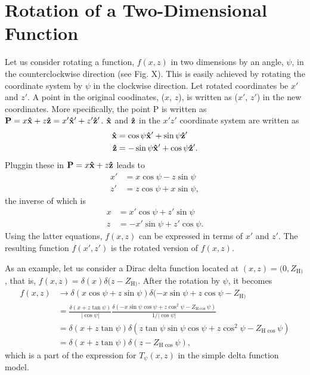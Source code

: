 \documentclass[12pt,letterpaper]{article}
\newcommand{\zh}[1]{Z_{\mathrm{H}#1}}
\begin{document}
\section{Rotation of a Two-Dimensional Function}
Let us consider rotating a function, $f(x,z)$ in two dimensions by an angle, 
$\psi$, in the counterclockwise direction (see Fig. X). This is easily 
achieved by rotating the coordinate system by $\psi$ in the clockwise direction. 
Let rotated coordinates be $x'$ and $z'$. A point in the original coodinates,
($x$, $z$), is written as ($x'$, $z'$) in the new coordinates. More specifically,
the point P is written as 
$\mathbf{P}=x\mathbf{\hat{x}}+z\mathbf{\hat{z}}=x'\mathbf{\hat{x}}'+z'\mathbf{\hat{z}}'$. $\mathbf{\hat{x}}$ and $\mathbf{\hat{z}}$ in
the $x'z'$ coordinate system are written as 
\begin{align}
  \mathbf{\hat{x}} &= \cos\psi\mathbf{\hat{x}}'+\sin\psi\mathbf{\hat{z}}' \\
  \mathbf{\hat{z}} &= -\sin\psi\mathbf{\hat{x}}'+\cos\psi\mathbf{\hat{z}}'.
\end{align}
Pluggin these in $\mathbf{P}=x\mathbf{\hat{x}}+z\mathbf{\hat{z}}$ leads to
\begin{align}
  x' &= x\cos\psi - z\sin\psi \\
  z' &= z\cos\psi + x\sin\psi,
\end{align}
the inverse of which is
\begin{align}
  x &= x'\cos\psi + z'\sin\psi \\
  z &= -x'\sin\psi + z'\cos\psi.
\end{align}
Using the latter equations, $f(x,z)$ can be expressed in terms of $x'$ and $z'$. 
The resulting function $f(x',z')$ is the rotated version of $f(x,z)$. 

As an 
example, let us consider a Dirac delta function located at $(x,z)=(0,\zh)$,
that is, $f(x,z)=\delta(x)\delta(z-\zh)$. After the rotation by $\psi$, it 
becomes
\begin{align*}
  f(x,z) 
  &\rightarrow 
    \delta(x\cos\psi+z\sin\psi) \delta(-x\sin\psi+z\cos\psi-\zh) \\
  &= \frac{\delta(x+z\tan\psi)}{|\cos\psi|}
     \frac{\delta(-x\sin\psi\cos\psi+z\cos^2\psi-\zh\cos\psi)}{1/|\cos\psi|} \\
  &= \delta(x+z\tan\psi)\delta(z\tan\psi\sin\psi\cos\psi+z\cos^2\psi-\zh\cos\psi) \\
  &= \delta(x+z\tan\psi)\delta(z-\zh\cos\psi),
\end{align*}
which is a part of the expression for $T_\psi(x,z)$ in the simple delta 
function model.


\end{document}
